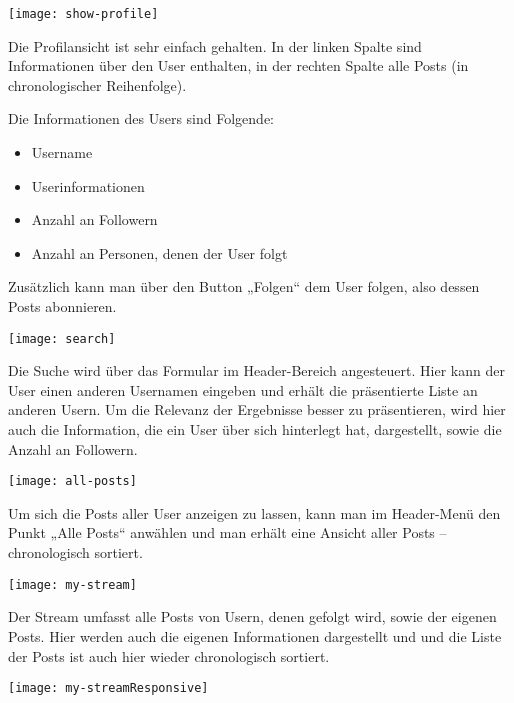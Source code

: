 \newpage
    \begin{center}
      \texttt{[image: show-profile]}
    \end{center}

    Die Profilansicht ist sehr einfach gehalten. In der linken Spalte sind Informationen über den User enthalten, in der rechten Spalte alle Posts (in chronologischer Reihenfolge).

    Die Informationen des Users sind Folgende:
    \begin{itemize}
      \item Username
      \item Userinformationen
      \item Anzahl an Followern
      \item Anzahl an Personen, denen der User folgt
    \end{itemize}

    Zusätzlich kann man über den Button „Folgen“ dem User folgen, also dessen Posts abonnieren.

\newpage
    \begin{center}
      \texttt{[image: search]}
    \end{center}

    Die Suche wird über das Formular im Header-Bereich angesteuert. Hier kann der User einen anderen Usernamen eingeben und erhält die präsentierte Liste an anderen Usern. Um die Relevanz der Ergebnisse besser zu präsentieren, wird hier auch die Information, die ein User über sich hinterlegt hat, dargestellt, sowie die Anzahl an Followern.

    \begin{center}
      \texttt{[image: all-posts]}
    \end{center}

    Um sich die Posts aller User anzeigen zu lassen, kann man im Header-Menü den Punkt „Alle Posts“ anwählen und man erhält eine Ansicht aller Posts – chronologisch sortiert.

\newpage
    \begin{center}
      \texttt{[image: my-stream]}
    \end{center}

    Der Stream umfasst alle Posts von Usern, denen gefolgt wird, sowie der eigenen Posts. Hier werden auch die eigenen Informationen dargestellt und und die Liste der Posts ist auch hier wieder chronologisch sortiert.

    \begin{center}
      \texttt{[image: my-streamResponsive]}
    \end{center}

